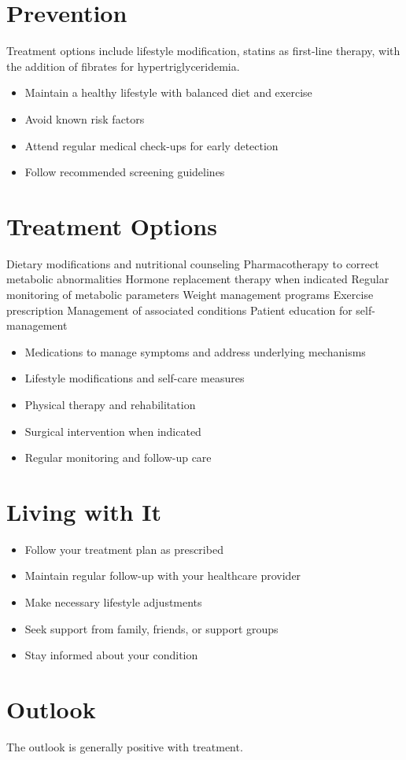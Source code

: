 \section{Prevention}
Treatment options include lifestyle modification, statins as first-line therapy, with the addition of fibrates for hypertriglyceridemia.

\begin{itemize}[noitemsep]
  \item Maintain a healthy lifestyle with balanced diet and exercise
  \item Avoid known risk factors
  \item Attend regular medical check-ups for early detection
  \item Follow recommended screening guidelines
\end{itemize}
\section{Treatment Options}
Dietary modifications and nutritional counseling Pharmacotherapy to correct metabolic abnormalities Hormone replacement therapy when indicated Regular monitoring of metabolic parameters Weight management programs Exercise prescription Management of associated conditions Patient education for self-management

\begin{itemize}[noitemsep]
  \item Medications to manage symptoms and address underlying mechanisms
  \item Lifestyle modifications and self-care measures
  \item Physical therapy and rehabilitation
  \item Surgical intervention when indicated
  \item Regular monitoring and follow-up care
\end{itemize}
\section{Living with It}
\begin{itemize}[noitemsep]
  \item Follow your treatment plan as prescribed
  \item Maintain regular follow-up with your healthcare provider
  \item Make necessary lifestyle adjustments
  \item Seek support from family, friends, or support groups
  \item Stay informed about your condition
\end{itemize}
\section{Outlook}
The outlook is generally positive with treatment.
